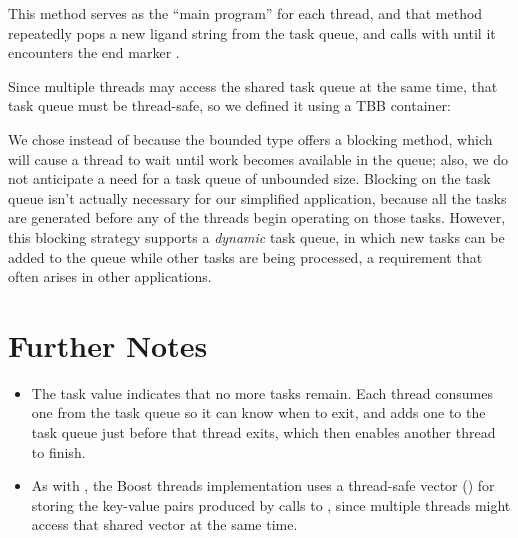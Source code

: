 \documentclass[letterpaper,10pt,openany,oneside]{sphinxmanual}
\begin{document}
This method  serves as the “main program” for each thread, and that method repeatedly pops a new ligand string  from the task queue, and calls  with  until it encounters the end marker .

Since multiple threads may access the shared task queue  at the same time, that task queue must be thread-safe, so we defined it using a TBB container:
\begin{quote}

\end{quote}

We chose  instead of  because the bounded type offers a blocking  method, which will cause a thread to wait until work becomes available in the queue; also, we do not anticipate a need for a task queue of unbounded size. Blocking on the task queue isn’t actually necessary for our simplified application, because all the tasks are generated before any of the threads begin operating on those tasks. However, this blocking strategy supports a \emph{dynamic} task queue, in which new tasks can be added to the queue while other tasks are being processed, a requirement that often arises in other applications.


\section{Further Notes}
\label{boostthreads/boostthreads:further-notes}\begin{itemize}
\item {} 
The  task value indicates that no more tasks remain. Each thread consumes one  from the task queue so it can know when to exit, and adds one  to the task queue just before that thread exits, which then enables another thread to finish.

\item {} 
As with , the Boost threads implementation uses a thread-safe vector () for storing the key-value pairs produced by calls to , since multiple threads might access that shared vector at the same time.

\end{itemize}
\end{document}
